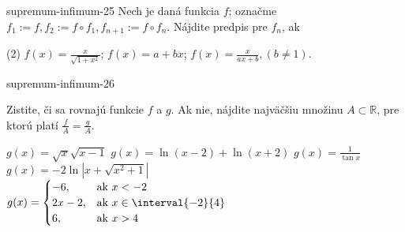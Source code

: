 \begin{defproblem}{supremum-infimum-25}
Nech je daná funkcia $f$; označme $f_1:=f,f_2:=f\circ f_1,f_{n+1}:=f\circ f_n$. Nájdite predpis pre $f_n$, ak
\begin{tasks}(2)
  \task $f(x)=\frac{x}{\sqrt{1+x^2}}$;
  \task $f(x)=a+bx$;
  \task $f(x)=\frac{x}{ax+b},(b\neq 1)$.
\end{tasks}
\end{defproblem}

\begin{defproblem}{supremum-infimum-26}
\begin{samepage}
Zistite, či sa rovnajú funkcie $f$ a $g$. Ak nie, nájdite najväčšiu množinu
$A\subset\mathbb{R}$, pre ktorú platí $\frac{f}{A}=\frac{g}{A}$.
\begin{tasks}
  \task
    $g(x) = \sqrt{x} \sqrt{x-1}$
  \task
    $g(x) = \ln{(x-2)} + \ln{(x+2)}$
  \task
    $g(x) = \frac{1}{\tan{x}}$
  \task
    $g(x) = -2 \ln{|x+\sqrt{x^2+1}|}$
  \task
    \\
    $g(x) =
      \begin{cases}
        -6,     & \text{ak } x < -2 \\
        2x - 2, & \text{ak } x \in \interval{-2}{4} \\
        6,      & \text{ak } x > 4
      \end{cases}
    $
\end{tasks}
\end{samepage}
\end{defproblem}

